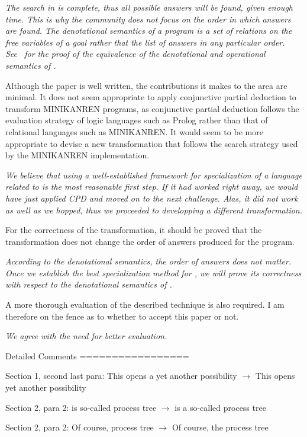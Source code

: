 \emph{The search in \mk is complete, thus all possible answers will be found, given enough time. This is why the \mk community does not focus on the order in which answers are found. The denotational semantics of a \mk program is a set of relations on the free variables of a goal rather that the list of answers in any particular order. See~\cite{rozplokhas2020certified} for the proof of the equivalence of the denotational and operational semantics of \mk.}

Although the paper is well written, the contributions it makes to the area are minimal. It does not seem appropriate to apply conjunctive partial deduction to transform MINIKANREN programs, as conjunctive partial deduction follows the evaluation strategy of logic languages such as Prolog rather than that of relational languages such as MINIKANREN. It would seem to be more appropriate to devise a new transformation that follows the search strategy used by the MINIKANREN implementation.

\emph{We believe that using a well-established framework for specialization of a language related to \mk is the most reasonable first step. If it had worked right away, we would have just applied CPD and moved on to the next challenge. Alas, it did not work as well as we hopped, thus we proceeded to developping a different transformation.}

For the correctness of the transformation, it should be proved that the transformation does not change the order of answers produced for the program.

\emph{According to the denotational semantics, the order of answers does not matter. Once we establish the best specialization method for \mk, we will prove its correctness with respect to the denotational semantics of \mk.}

A more thorough evaluation of the described technique is also required. I am therefore on the fence as to whether to accept this paper or not.

\emph{We agree with the need for better evaluation.}

Detailed Comments
=================

Section 1, second last para: This opens a yet another possibility $\to$ This opens yet another possibility

Section 2, para 2: is so-called process tree $\to$ is a so-called process tree

Section 2, para 2: Of course, process tree $\to$ Of course, the process tree

